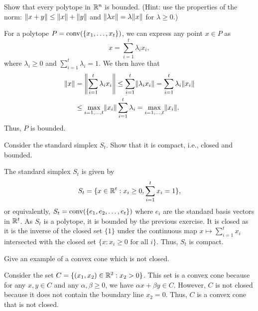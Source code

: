 \begin{exercise}
  Show that every polytope in $\R^n$ is bounded.
  (Hint: use the properties of the norm: $\norm{x + y} \leq \norm{x} + \norm{y}$ and $\norm{\lambda x} = \lambda \norm{x}$ for $\lambda \geq 0$.)
\end{exercise}

\begin{solution}
  For a polytope $P = \conv(\{x_1, \ldots, x_t\})$, we can express any point $x \in P$ as
  \begin{equation}
    x = \sum_{i=1}^t \lambda_i x_i,
  \end{equation}
  where $\lambda_i \geq 0$ and $\sum_{i=1}^t \lambda_i = 1$.
  We then have that
  \begin{equation}
    \begin{split}
      \norm{x}
      &= \norm*{\sum_{i=1}^t \lambda_i x_i} \leq \sum_{i=1}^t \norm{\lambda_i x_i} = \sum_{i=1}^t \lambda_i \norm{x_i} \\
      &\leq \max_{i=1, \ldots, t} \norm{x_i} \sum_{i=1}^t \lambda_i = \max_{i=1, \ldots, t} \norm{x_i}.
    \end{split}
  \end{equation}
  Thus, $P$ is bounded.
\end{solution}

\begin{exercise}
  Consider the standard simplex $S_t$.
  Show that it is compact, i.e., closed and bounded.
\end{exercise}

\begin{solution}
  The standard simplex $S_t$ is given by
  \begin{equation}
    S_t = \{ x \in \R^t : x_i \geq 0, \sum_{i=1}^t x_i = 1 \},
  \end{equation}
  or equivalently, $S_t = \conv(\{e_1, e_2, \ldots, e_t\})$ where $e_i$ are the standard basis vectors in $\R^t$.
  As $S_t$ is a polytope, it is bounded by the previous exercise.
  It is closed as it is the inverse of the closed set $\{1\}$ under the continuous map $x \mapsto \sum_{i=1}^t x_i$ intersected with the closed set $\{ x : x_i \geq 0 \text{ for all } i \}$.
  Thus, $S_t$ is compact.
\end{solution}

\begin{exercise}
  Give an example of a convex cone which is not closed.
\end{exercise}

\begin{solution}
  Consider the set $C = \{ (x_1, x_2) \in \R^2 : x_2 > 0 \}$.
  This set is a convex cone because for any $x, y \in C$ and any $\alpha, \beta \geq 0$, we have $\alpha x + \beta y \in C$.
  However, $C$ is not closed because it does not contain the boundary line $x_2 = 0$.
  Thus, $C$ is a convex cone that is not closed.
\end{solution}

